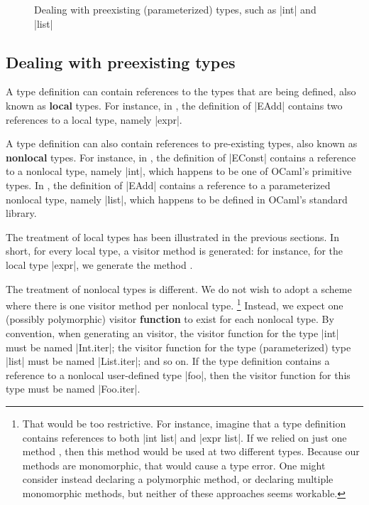 \documentclass[11pt,a4paper,twoside]{article}
\renewcommand{\emph}[1]{\textbf{#1}}
\begin{document}

\begin{figure}[t]
\vspace{-\baselineskip}
\caption{Dealing with preexisting (parameterized) types, such as \oc|int| and \oc|list|}
\label{fig:expr11}
\end{figure}

\subsection{Dealing with preexisting types}
\label{sec:intro:nonlocal}

A type definition can contain references to the types that are being defined,
also known as \emph{local} types. For instance, in , the
definition of \oc|EAdd| contains two references to a local type, namely
\oc|expr|.

A type definition can also contain references to pre-existing types, also
known as \emph{nonlocal} types. For instance, in , the
definition of \oc|EConst| contains a reference to a nonlocal type, namely
\oc|int|, which happens to be one of OCaml's primitive types. In
, the definition of \oc|EAdd| contains a reference to a
parameterized nonlocal type, namely \oc|list|, which happens to be defined in
OCaml's standard library.

The treatment of local types has been illustrated in the previous sections.
In short, for every local type, a visitor method is generated: for instance,
for the local type \oc|expr|, we generate the method .

The treatment of nonlocal types is different. We do not wish to adopt a scheme
where there is one visitor method per nonlocal type.%
%
\footnote{That would be too restrictive. For instance, imagine that a type
  definition contains references to both \oc|int list| and \oc|expr list|. If
  we relied on just one method , then this method would be
  used at two different types. Because our methods are monomorphic, that would
  cause a type error. One might consider instead declaring a polymorphic
  method, or declaring multiple monomorphic methods, but neither of these
  approaches seems workable.}
%
Instead, we expect one (possibly polymorphic) visitor \emph{function} to exist
for each nonlocal type. By convention, when generating an \iter visitor, the
visitor function for the type \oc|int| must be named \oc|Int.iter|; the
visitor function for the type (parameterized) type \oc|list| must be named
\oc|List.iter|; and so on. If the type definition contains a reference to a
nonlocal user-defined type \oc|foo|, then the visitor function for this type
must be named \oc|Foo.iter|.
\end{document}
